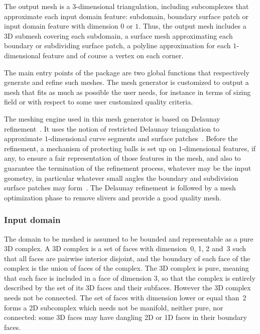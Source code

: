 

The output mesh is a 3-dimensional triangulation, 
including subcomplexes that approximate each input domain feature: subdomain,
boundary surface patch or input domain feature with dimension $0$ or $1$.
Thus,  the output mesh includes  a 3D submesh covering each  subdomain, 
a surface mesh approximating  each boundary or subdividing
surface patch, a polyline approximation for  each 
$1$-dimensional feature and 
of course  a vertex on each  corner.


 The main entry points of the package are
two global  functions that respectively generate
and refine such meshes.
The mesh generator is customized to output a mesh
that fits as much as possible the user needs,
for instance in terms of  sizing field 
or with respect to some user customized quality criteria.


The  meshing engine used in this mesh generator
is  based on  Delaunay refinement~\cite{c-gqmgc-93, r-draq2d-95, s-tmgdr-98}.
It uses the notion of restricted Delaunay triangulation
 to approximate $1$-dimensional curve segments and   surface patches~\cite{cgal:bo-pgsms-05}.
Before the refinement, a mechanism of protecting balls is set up on $1$-dimensional features, if any,
 to ensure a fair representation
of those features in the mesh, and also to guarantee the termination of the refinement process,
whatever may be the input geometry, in particular whatever small angles
the boundary and subdivision surface patches may form~\cite{cgal:cdl-pdma-07,cgal:cdr-drpsc-07}.
The Delaunay refinement is followed by a mesh  optimization phase
to remove slivers and provide a good quality mesh.
 




\subsubsection{Input domain}

The  domain to be meshed is assumed to be bounded
 and  representable as a pure
3D complex. A 3D complex is a set of faces with dimension~0,
1, 2  and~3  such that
all faces are pairwise interior disjoint, 
and the boundary of each face of the complex is the union of faces
of the complex.
The 3D complex is pure, meaning that each face is included in a face of dimension 3,
so that the complex is entirely described by the set of its 3D faces and their subfaces.
However the 3D complex needs not be connected.
The set of faces with dimension lower or equal than~2 forms a 2D
subcomplex which needs not be manifold, neither pure, nor connected:
some 3D faces may have dangling 2D or 1D faces in their boundary faces.


